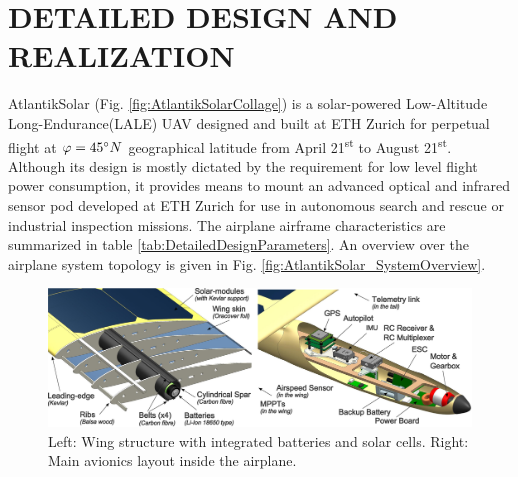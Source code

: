 \section{DETAILED DESIGN AND REALIZATION}\label{sec:detailed_design}

AtlantikSolar (Fig. \ref{fig:AtlantikSolarCollage}) is a solar-powered Low-Altitude Long-Endurance(LALE) UAV designed and built at ETH Zurich for perpetual flight at $\varphi=45\degree N$ geographical latitude from April 21\textsuperscript{st} to August 21\textsuperscript{st}. Although its design is mostly dictated by the requirement for low level flight power consumption, it provides means to mount an advanced optical and infrared sensor pod developed at ETH Zurich for use in autonomous search and rescue or industrial inspection missions. The airplane airframe characteristics are summarized in table \ref{tab:DetailedDesignParameters}. An overview over the airplane system topology is given in Fig. \ref{fig:AtlantikSolar_SystemOverview}.

\begin{figure}[h]
    \centering
    \includegraphics[width=\linewidth]{images/10_CAD_AtlantikSolarAvionicsCombined/10_CAD_AtlantikSolarAvionicsCombined}
    \caption{Left: Wing structure with integrated batteries and solar cells. Right: Main avionics layout inside the airplane.}
    \label{fig:CAD_AtlantikSolarStructureAndAvionics}
\end{figure}


